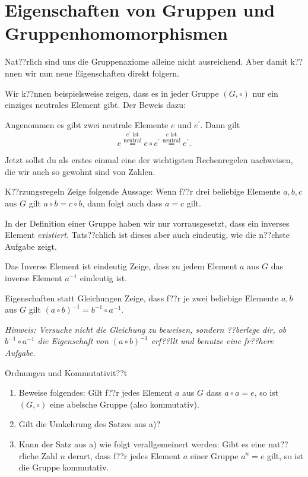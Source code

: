 \documentclass[a4paper,ngerman,12pt]{zirkelblatt1415}
\theoremstyle{definition}
\theoremstyle{plain}
\theoremstyle{remark}
\begin{document}
\section{Eigenschaften von Gruppen und Gruppenhomomorphismen}

Nat??rlich sind uns die Gruppenaxiome alleine nicht ausreichend. Aber damit k??nnen wir nun neue Eigenschaften direkt folgern.


Wir k??nnen beispielsweise zeigen, dass es in jeder Gruppe $(G,\circ)$ nur ein einziges neutrales Element gibt. Der Beweis dazu:

Angenommen es gibt zwei neutrale Elemente $e$ und $e^\prime$. Dann gilt
$$ e \stackrel{e^\prime\text{ ist}}{\stackrel{\text{neutral}}{=}} e\circ e^\prime \stackrel{e\text{ ist}}{\stackrel{\text{neutral}}{=}} e^\prime.$$

Jetzt sollst du als erstes einmal eine der wichtigsten Rechenregelen nachweisen, die wir auch so gewohnt sind von Zahlen.

\begin{aufgabe}{K??rzungsregeln}
Zeige folgende Aussage: Wenn f??r drei beliebige Elemente $a,b,c$ aus $G$ gilt $a\circ b = c\circ b$, dann folgt auch dass $a = c$ gilt.
\end{aufgabe}

In der Definition einer Gruppe haben wir nur vorrausgesetzt, dass ein inverses Element \emph{existiert}. Tats??chlich ist dieses aber auch eindeutig, wie die n??chste Aufgabe zeigt.

\begin{aufgabe}{Das Inverse Element ist eindeutig}
Zeige, dass zu jedem Element $a$ aus $G$ das inverse Element $a^{-1}$ eindeutig ist.
\end{aufgabe}

\begin{aufgabe}{Eigenschaften statt Gleichungen}
Zeige, dass f??r je zwei beliebige Elemente $a,b$ aus $G$ gilt $(a\circ b)^{-1} = b^{-1}\circ a^{-1}$.

\textit{Hinweis: Versuche nicht die Gleichung zu beweisen, sondern ??berlege dir, ob $b^{-1}\circ a^{-1}$ die Eigenschaft von $(a\circ b)^{-1}$  erf??llt und benutze eine fr??here Aufgabe.}
\end{aufgabe}

\begin{aufgabe}{Ordnungen und Kommutativit??t}
\begin{enumerate}
\item Beweise folgendes: Gilt f??r jedes Element $a$ aus $G$ dass $a\circ a = e$, so ist $(G,\circ)$ eine abelsche Gruppe (also kommutativ).
\item Gilt die Umkehrung des Satzes aus a)?
\item Kann der Satz aus a) wie folgt verallgemeinert werden: Gibt es eine nat??rliche Zahl $n$ derart, dass f??r jedes Element $a$ einer Gruppe  $a^n=e$ gilt\footnotemark, so ist die Gruppe kommutativ.
\end{enumerate}
\end{aufgabe}
\end{document}
